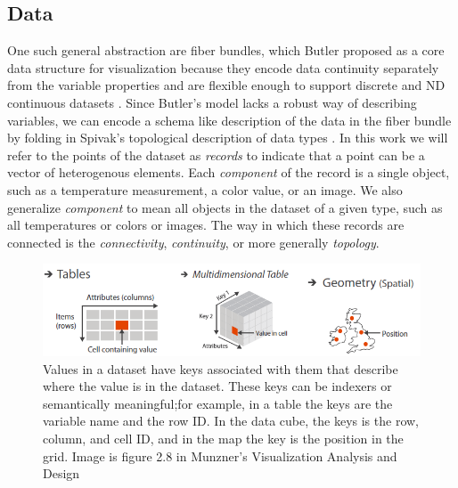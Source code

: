\documentclass[../main.tex]{subfiles}
\begin{document}
\subsection{Data}
\label{sec:intro_data}
One such general abstraction are fiber bundles, which Butler proposed as a core data structure for visualization because they encode data continuity separately from the variable properties and are flexible enough to support discrete and ND continuous datasets \cite{butlerVisualizationModelBased1989,butlerVectorBundleClassesForm1992}. 
Since Butler's model lacks a robust way of describing variables, we can encode a schema like description of the data in the fiber bundle by folding in Spivak's topological description of data types \cite{spivakDatabasesAreCategories2010,spivakSIMPLICIALDATABASES}. In this work we will refer to the points of the dataset as \textit{records} to indicate that a point can be a vector of heterogenous elements. Each \textit{component} of the record is a single object, such as a temperature measurement, a color value, or an image. We also generalize \textit{component} to mean all objects in the dataset of a given type, such as all temperatures or colors or images. The way in which these records are connected is the \textit{connectivity}, \textit{continuity}, or more generally \textit{topology}.

\begin{figure}[H]
    \includegraphics[width=1\textwidth]{figures/intro/munzner_datatypes.png}
    \caption{Values in a dataset have keys associated with them that describe where the value is in the dataset. These keys can be indexers or semantically meaningful;for example, in a table the keys are the variable name and the row ID. In the data cube,  the keys is the row, column, and cell ID, and in the map the key is the position in the grid. Image is figure 2.8 in Munzner's Visualization Analysis and Design\cite{munznerVisualizationAnalysisDesign2014}}
    \label{fig:intro:keys_values}
\end{figure}
\end{document}
